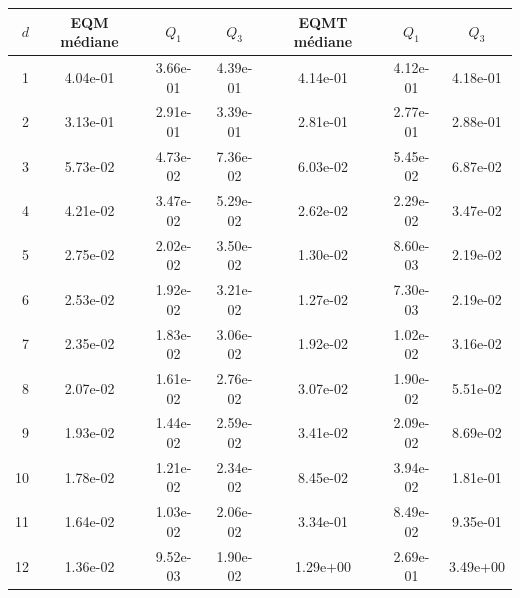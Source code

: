 \begin{tabular}{r S[table-format=1.2e-2] S[table-format=1.2e-2] S[table-format=1.2e-2] S[table-format=1.2e-2] S[table-format=1.2e-2] S[table-format=1.2e-2]}
\toprule
{\(d\)} & {EQM m\'ediane} & {\(Q_1\)} & {\(Q_3\)} & {EQMT m\'ediane} & {\(Q_1\)} & {\(Q_3\)} \\
 & 4.04e-01 & 3.66e-01 & 4.39e-01 & 4.14e-01 & 4.12e-01 & 4.18e-01 \\
2 & 3.13e-01 & 2.91e-01 & 3.39e-01 & 2.81e-01 & 2.77e-01 & 2.88e-01 \\
3 & 5.73e-02 & 4.73e-02 & 7.36e-02 & 6.03e-02 & 5.45e-02 & 6.87e-02 \\
4 & 4.21e-02 & 3.47e-02 & 5.29e-02 & 2.62e-02 & 2.29e-02 & 3.47e-02 \\
5 & 2.75e-02 & 2.02e-02 & 3.50e-02 & 1.30e-02 & 8.60e-03 & 2.19e-02 \\
6 & 2.53e-02 & 1.92e-02 & 3.21e-02 & 1.27e-02 & 7.30e-03 & 2.19e-02 \\
7 & 2.35e-02 & 1.83e-02 & 3.06e-02 & 1.92e-02 & 1.02e-02 & 3.16e-02 \\
8 & 2.07e-02 & 1.61e-02 & 2.76e-02 & 3.07e-02 & 1.90e-02 & 5.51e-02 \\
9 & 1.93e-02 & 1.44e-02 & 2.59e-02 & 3.41e-02 & 2.09e-02 & 8.69e-02 \\
10 & 1.78e-02 & 1.21e-02 & 2.34e-02 & 8.45e-02 & 3.94e-02 & 1.81e-01 \\
11 & 1.64e-02 & 1.03e-02 & 2.06e-02 & 3.34e-01 & 8.49e-02 & 9.35e-01 \\
12 & 1.36e-02 & 9.52e-03 & 1.90e-02 & 1.29e+00 & 2.69e-01 & 3.49e+00 \\
\bottomrule
\end{tabular}
